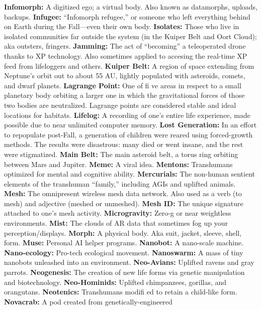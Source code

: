 \textbf{ Infomorph:} A digitized ego; a virtual body. Also known 
as datamorphs, uploads, backups.
\textbf{ Infugee:} ``Infomorph refugee,'' or someone who left 
everything behind on Earth during the Fall—even their 
own body.
\textbf{ Isolates:} Those who live in isolated communities far 
outside the system (in the Kuiper Belt and Oort Cloud); 
aka outsters, fringers.
\textbf{ Jamming:} The act of ``becoming'' a teleoperated drone 
thanks to XP technology. Also sometimes applied to 
accesing the real-time XP feed from lifeloggers and others.
\textbf{ Kuiper Belt:} A region of space extending from Neptune's 
orbit out to about 55 AU, lightly populated with asteroids, 
comets, and dwarf planets.
\textbf{ Lagrange Point:} One of ﬁ ve areas in respect to a 
small planetary body orbiting a larger one in which the 
gravitational forces of those two bodies are neutralized. 
Lagrange points are considered stable and ideal locations 
for habitats.
\textbf{ Lifelog:} A recording of one's entire life experience, made 
possible due to near unlimited computer memory.
\textbf{ Lost Generation:} In an effort to repopulate post-Fall, a 
generation of children were reared using forced-growth 
methods. The results were disastrous: many died or went 
insane, and the rest were stigmatized.
\textbf{ Main Belt:} The main asteroid belt, a torus ring orbiting 
between Mars and Jupiter.
\textbf{ Meme:} A viral idea.
\textbf{ Mentons:} Transhumans optimized for mental and 
cognitive ability.
\textbf{ Mercurials:} The non-human sentient elements of the 
transhuman ``family,'' including AGIs and uplifted animals.
\textbf{ Mesh:} The omnipresent wireless mesh data network. 
Also used as a verb (to mesh) and adjective (meshed or 
unmeshed).
\textbf{ Mesh ID:} The unique signature attached to one's mesh 
activity.
\textbf{ Microgravity:} Zero-g or near weightless environments.
\textbf{ Mist:} The clouds of AR data that sometimes fog up your 
perception/displays.
\textbf{ Morph:} A physical body. Aka suit, jacket, sleeve, shell, form.
\textbf{ Muse:} Personal AI helper programs.
\textbf{ Nanobot:} A nano-scale machine.
\textbf{ Nano-ecology:} Pro-tech ecological movement.
\textbf{ Nanoswarm:} A mass of tiny nanobots unleashed into an 
environment.
\textbf{ Neo-Avians:} Uplifted ravens and gray parrots.
\textbf{ Neogenesis:} The creation of new life forms via genetic 
manipulation and biotechnology.
\textbf{ Neo-Hominids:} Uplifted chimpanzees, gorillas, and 
orangutans.
\textbf{ Neotenics:} Transhumans modiﬁ ed to retain a child-like 
form.
\textbf{ Novacrab:} A pod created from genetically-engineered 
